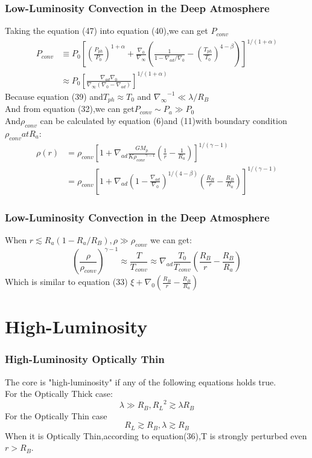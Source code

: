 \documentclass{beamer}
\begin{document}
\begin{frame}
\frametitle{Low-Luminosity Convection in the Deep Atmosphere}
Taking the equation (47) into equation (40),we can get $P_{conv}$
\begin{equation}
\begin{split}
P_{conv} &  \equiv P_0[{(\frac{P_{ph}}{P_0})}^{1+\alpha}+\frac{\nabla_0}{\nabla_{\infty}}(\frac{1}{1-\nabla_{ad}/\nabla_0}-{(\frac{T_{ph}}{T_0})}^{4-\beta})]^{1/(1+\alpha)}\\
& \approx P_0 {[\frac{\nabla_{ad}\nabla_0}{\nabla_{\infty}(\nabla_0-\nabla_{ad})}]}^{1/(1+\alpha)}
\end{split}
\end{equation}
Because equation (39) and$ T_{ph} \approx T_0 $ and ${\nabla_{\infty}}^{-1} \ll \lambda/R_B$\\
And from equation (32),we can get$P_{conv} \sim P_a \gg P_0$\\
And$\rho_{conv}$ can be calculated by equation (6)and (11)with boundary condition $ \rho_{conv} at R_a$:
\begin{equation}
\begin{split}
\rho(r)& =\rho_{conv}{[1+\nabla_{ad}\frac{GM_p}{K{\rho_{conv}}^{\gamma-1}}(\frac{1}{r}-\frac{1}{R_a})]}^{1/(\gamma-1)}\\
&=\rho_{conv}{[1+\nabla_{ad}{(1-\frac{\nabla_{ad}}{\nabla_0})}^{1/(4-\beta)}(\frac{R_B}{r}-\frac{R_B}{R_a})]}^{1/(\gamma-1)}
\end{split}
\end{equation}
\end{frame}

\begin{frame}
\frametitle{Low-Luminosity Convection in the Deep Atmosphere}
When $r \lesssim R_a(1-R_a/R_B),\rho \gg \rho_{conv}$ we can get:
\begin{equation}
{(\frac{\rho}{\rho_{conv}})}^{\gamma-1} \approx \frac{T}{T_{conv}} \approx \nabla_{ad}\frac{T_0}{T_{conv}}(\frac{R_B}{r}-\frac{R_B}{R_a})
\end{equation}
Which is similar to equation (33) $\xi + \nabla_0 (\frac{R_B}{r}-\frac{R_B}{R_a})$
\end{frame}

\section{High-Luminosity}
\begin{frame}
\frametitle{High-Luminosity Optically Thin}
The core is "high-luminosity" if any of the following equations holds true.\\
For the Optically Thick case:
\begin{equation}
\lambda \gg R_B , {R_L}^2 \gtrsim \lambda R_B
\end{equation}
For the Optically Thin case 
\begin{equation}
\tag{54}
R_L \gtrsim R_B , \lambda \gtrsim R_B 
\end{equation}
When it is Optically Thin,according to equation(36),T is strongly perturbed even $r>R_B$.
\end{frame}
\end{document}
